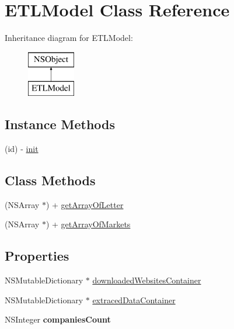 \hypertarget{interface_e_t_l_model}{\section{E\-T\-L\-Model Class Reference}
\label{interface_e_t_l_model}
}
Inheritance diagram for E\-T\-L\-Model\-:\begin{figure}[H]
\begin{center}
\leavevmode
\includegraphics[height=2.000000cm]{interface_e_t_l_model}
\end{center}
\end{figure}
\subsection*{Instance Methods}
\begin{DoxyCompactItemize}
\item 
(id) -\/ \hyperlink{interface_e_t_l_model_a2279b14ed0615a31164d3f89ffe95540}{init}
\end{DoxyCompactItemize}
\subsection*{Class Methods}
\begin{DoxyCompactItemize}
\item 
(N\-S\-Array $\ast$) + \hyperlink{interface_e_t_l_model_aa46c25472f9f40f093e4ea1037efd3c8}{get\-Array\-Of\-Letter}
\item 
(N\-S\-Array $\ast$) + \hyperlink{interface_e_t_l_model_ad891b777eaca1269460510e899fd39db}{get\-Array\-Of\-Markets}
\end{DoxyCompactItemize}
\subsection*{Properties}
\begin{DoxyCompactItemize}
\item 
N\-S\-Mutable\-Dictionary $\ast$ \hyperlink{interface_e_t_l_model_a0fa86c2ddfab6f687e8e7e096260c5cb}{downloaded\-Websites\-Container}
\item 
N\-S\-Mutable\-Dictionary $\ast$ \hyperlink{interface_e_t_l_model_a1dec777c4fc38530d5043610595c418c}{extraced\-Data\-Container}
\item 
\hypertarget{interface_e_t_l_model_ae9304d7a3be9291259ec48aa075b3389}{N\-S\-Integer {\bfseries companies\-Count}}\label{interface_e_t_l_model_ae9304d7a3be9291259ec48aa075b3389}

\end{DoxyCompactItemize}


